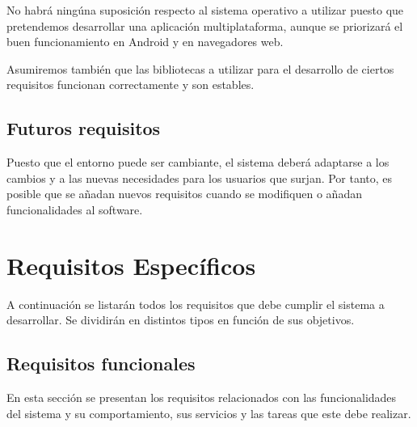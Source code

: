 No habrá ningúna suposición respecto al sistema operativo a utilizar puesto que pretendemos desarrollar una aplicación multiplataforma, aunque se priorizará el buen funcionamiento en Android y en navegadores web.

Asumiremos también que las bibliotecas a utilizar para el desarrollo de ciertos requisitos funcionan correctamente y son estables.

\subsection{Futuros requisitos}
Puesto que el entorno puede ser cambiante, el sistema deberá adaptarse a los cambios y a las nuevas necesidades para los usuarios que surjan.
Por tanto, es posible que se añadan nuevos requisitos cuando se modifiquen o añadan funcionalidades al software.

\section{Requisitos Específicos}
A continuación se listarán todos los requisitos que debe cumplir el sistema a desarrollar. Se dividirán en distintos tipos en función de sus objetivos.

\subsection{Requisitos funcionales}
En esta sección se presentan los requisitos relacionados con las funcionalidades del sistema y su comportamiento, sus servicios y las tareas que este debe realizar.

